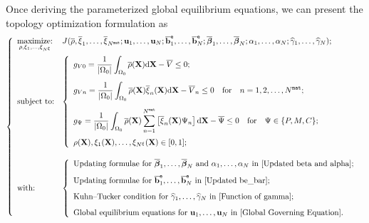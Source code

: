 \documentclass[preprint,11pt]{elsarticle}
\theoremstyle{definition}
\begin{document}
Once deriving the parameterized global equilibrium equations, we can present the topology optimization formulation as
\begin{equation} \label{Topology Optimization Formulation}
    \left\{ \begin{array}{ll}
        \underset{\rho, \xi_1, \ldots, \xi_{N^\xi}}{\text{maximize:}} & J(\overline{\rho}, \overline{\xi}_1, \ldots, \overline{\xi}_{N^\texttt{mat}}; \mathbf{u}_1, \ldots, \mathbf{u}_N; \overline{\mathbf{b}}_1^\texttt{e}, \ldots, \overline{\mathbf{b}}_N^\texttt{e}; \overline{\boldsymbol{\beta}}_1, \ldots, \overline{\boldsymbol{\beta}}_N; \alpha_1, \ldots, \alpha_N; \widehat{\gamma}_1, \ldots, \widehat{\gamma}_N); \\[12pt]
        
        \text{subject to:} & \left\{ \begin{array}{l}
            g_{V0} = \displaystyle \dfrac{1}{|\Omega_0|} \int_{\Omega_0} \overline{\rho}(\mathbf{X}) \text{d} \mathbf{X} - \overline{V} \leq 0; \\[15pt]
            g_{Vn} = \displaystyle \dfrac{1}{|\Omega_0|} \int_{\Omega_0} \overline{\rho}(\mathbf{X}) \overline{\xi}_n(\mathbf{X}) \text{d} \mathbf{X} - \overline{V}_n \leq 0 \quad \text{for} \quad n = 1,2,\ldots,N^\texttt{mat}; \\[15pt]
            g_\Psi = \displaystyle \dfrac{1}{|\Omega_0|} \int_{\Omega_0} \overline{\rho}(\mathbf{X}) \sum_{n=1}^{N^\texttt{mat}} \left[ \overline{\xi}_n(\mathbf{X}) \Psi_n \right] \text{d} \mathbf{X} - \overline{\Psi} \leq 0 \quad \text{for} \quad \Psi \in \{P, M, C\}; \\[15pt]
            \rho(\mathbf{X}), \xi_1(\mathbf{X}), \ldots, \xi_{N^\xi}(\mathbf{X}) \in [0, 1];
        \end{array} \right. \\
        \\[2pt]

        \text{with:} & \left\{ \begin{array}{l}
            \text{Updating formulae for $\overline{\boldsymbol{\beta}}_1, \ldots, \overline{\boldsymbol{\beta}}_N$ and $\alpha_1, \ldots, \alpha_N$ in \eqref{Updated beta and alpha}}; \\[8pt]
            \text{Updating formulae for $\overline{\mathbf{b}}_1^\texttt{e}, \ldots, \overline{\mathbf{b}}_N^\texttt{e}$ in \eqref{Updated be_bar}}; \\[8pt]
            \text{Kuhn--Tucker condition for $\widehat{\gamma}_1, \ldots, \widehat{\gamma}_N$ in \eqref{Function of gamma}}; \\[8pt]
            \text{Global equilibrium equations for $\mathbf{u}_1, \ldots, \mathbf{u}_N$ in \eqref{Global Governing Equation}}.
        \end{array} \right.
    \end{array} \right.
\end{equation}
\end{document}
